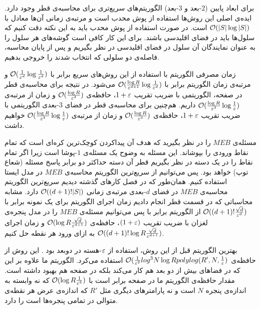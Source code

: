 برای ابعاد پایین ($2$-بعد و $3$-بعد) الگوریتم‌های سریع‌تری برای محاسبه‌ی قطر وجود دارد. ایده‌ی اصلی این روش‌ها استفاده از پوش محدب است و مرتبه‌ی زمانی آن‌ها معادل با
$\mathcal{O}(|S| \log |S|)$
است. در صورت استفاده از پوش محدب باید به این نکته دقت کنیم که سلول‌ها باید در فضای اقلیدسی باشند. برای این کار کافی است گوشه‌های هر سلول را به عنوان نمایندگان آن سلول در فضای اقلیدسی در نظر بگیریم و پس از پایان محاسبه، فاصله‌ی دو سلولی که انتخاب شدند را خروجی بدهیم.

زمان مصرفی الگوریتم  با استفاده از این روش‌های سریع برابر با
$\mathcal{O}(\frac{1}{\varepsilon^{d}} \log \frac{1}{\varepsilon^{d}})$
و مرتبه‌ی زمان الگوریتم  برابر با
$\mathcal{O}(\frac{\log R}{\varepsilon^{d+1}} \log \frac{1}{\varepsilon^{d}})$
می‌شود. در نتیجه برای محاسبه‌ی قطر در صفحه، الگوریتمی با ضریب تقریب $1 + \varepsilon$، حافظه‌ی
 $\mathcal{O}(\frac{\log R}{\varepsilon^{3}})$
 و زمان از مرتبه‌ی 
  $\mathcal{O}(\frac{\log R}{\varepsilon^{3}} \log \frac{1}{\varepsilon})$
  داریم. هم‌چنین برای محاسبه‌ی قطر در فضای $3$-بعدی الگوریتمی با ضریب تقریب $1 + \varepsilon$، حافظه‌ی
  $\mathcal{O}(\frac{\log R}{\varepsilon^{4}})$
  و زمان از مرتبه‌ی 
  $\mathcal{O}(\frac{\log R}{\varepsilon^{4}} \log \frac{1}{\varepsilon})$
خواهیم داشت.
 

مسئله‌ی $MEB$ را در نظر بگیرید که هدف آن پیدا‌کردن کوچک‌ترین کره‌ای است که تمام نقاط ورودی را بپوشاند. این مسئله به وضوح یک مسئله‌ی $1$-پوشا است زیرا اگر تمام نقاط را در یک دسته در نظر بگیریم قطر آن دسته حداکثر دو برابر پاسخ مسئله (شعاع توپ) خواهد بود. پس می‌توانیم از سریع‌ترین الگوریتم محاسبه‌ی $MEB$ در مدل ایستا استفاده کنیم. همان‌طور که در فصل کارهای گذشته دیدیم سریع‌ترین الگوریتم محاسبه‌ی $MEB$ در فضای $d$-بعدی  مرتبه‌ی زمانی
 $\mathcal{O}((d+1)! |S|)$
  دارد. مشابه محاسباتی که در قسمت قطر انجام دادیم زمان اجرای الگوریتم برای یک نمونه  برابر با 
$ \mathcal{O}((d+1)! \frac{\sqrt{d}}{\varepsilon^d})$
از الگوریتم برابر با پس می‌توانیم مسئله‌ی $MEB$ را در مدل پنجره‌ی لغزان با ضریب تقریب $(1+\varepsilon)$، حافظه‌ی 
$ \mathcal{O}(\log R \frac{\sqrt{d}}{\varepsilon^{d+1}})$
و زمان اجرای
$ \mathcal{O}((d+1)! \log R \frac{\sqrt{d}}{\varepsilon^{d+1}})$
به ازای ورود هر نقطه حل کنیم.

بهترین الگوریتم قبل از این روش، استفاده از $\varepsilon$-هسته در دوبعد بود . این روش از حافظه‌ی 
$ \mathcal{O}(\frac{1}{\varepsilon^2} log^3 N \log R polylog(R', N, \frac{1}{\varepsilon})$
استفاده می‌کرد. الگوریتم ما علاوه بر این که در فضاهای بیش از دو بعد هم کار می‌کند بلکه در صفحه هم بهبود داشته است. مقدار حافظه‌ی الگوریتم ما در صفحه برابر است با
$ \mathcal{O}(\log R \frac{1}{\varepsilon^3})$
که نه وابسته به اندازه‌ی پنجره $N$ است و نه پارامترهای دیگری مثل $R'$ که اندازه‌ی عرض هر نقطه‌ی متوالی در تمامی پنجره‌ها است را دارد.

